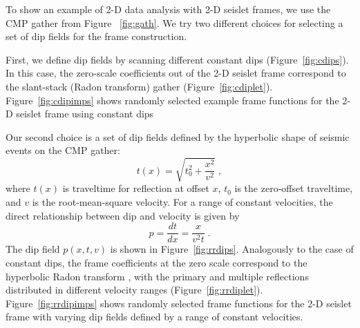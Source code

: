 \begin{comment}
The example is spectral decomposition of a 2-D seismic section,
extracted from the Boonsville 3-D dataset \cite[]{boon} and shown in
Figure~\ref{fig:boon}.  
We use a multi-channel PEF to detect the dominant
frequency components in all traces and then apply 1-D seislet frame
to separate different data components. Two of the components are
displayed in Figures~\ref{fig:boon3,flet3,spec3} and
\ref{fig:boon2,flet2,spec2}.  The first component corresponds to
relatively low frequencies, the second component corresponds to
relatively high frequencies (Figures~\ref{fig:boon3} and
\ref{fig:boon2}). The two components exhibit a high compression ratio
in the transform domain (Figures~\ref{fig:flet3} and \ref{fig:flet2})
and correspond to different parts of the spectrum
(Figures~\ref{fig:spec3} and \ref{fig:spec2}, compare with
Figure~\ref{fig:bspec}). Spectral decomposition
has important applications in seismic interpretation
\cite[]{spectral}.  By increasing the PEF size and, correspondingly,
the number of frame frequencies, one could obtain a more detailed
decomposition of the original data.

\subsection{Hyperbolic radon transform with 2-D seislet frame}
\end{comment}

To show an example of 2-D data analysis with 2-D seislet frames, we
use the CMP gather from Figure ~\ref{fig:gath}.  We try two different
choices for selecting a set of dip fields for the frame construction.

First, we define dip fields by scanning different constant dips
(Figure~\ref{fig:cdips}). In this case, the zero-scale coefficients
out of the 2-D seislet frame correspond to the slant-stack (Radon transform) gather
(Figure~\ref{fig:cdiplet}). Figure~\ref{fig:cdipimps} shows
randomly selected example frame functions for the 2-D seislet frame using constant dips

Our second choice is a set of dip fields defined by the hyperbolic shape
of seismic events on the CMP gather:
\begin{equation}
t(x)=\sqrt{t^2_0+\frac{x^2}{v^2}}\;,
\label{eq:hyper}
\end{equation} 
where $t(x)$ is traveltime for reflection at offset $x$,
$t_0$ is the zero-offset traveltime, and $v$ is the root-mean-square
velocity. For a range of constant velocities, the direct relationship between dip and
velocity is given by 
\begin{equation}
p =\frac{dt}{dx}=\frac{x}{v^2 t}\;.
\label{eq:hyperdip}
\end{equation} 
The dip field $p(x,t,v)$ is shown in
Figure~\ref{fig:rrdips}. Analogously to the case of constant dips, the
frame coefficients at the zero scale correspond to the hyperbolic
Radon transform \cite[]{GEO50-12-27272741}, with the primary and
multiple reflections distributed in different velocity ranges
(Figure~\ref{fig:rrdiplet}).  Figure~\ref{fig:rrdipimps} shows
randomly selected frame functions for the 2-D seislet frame with
varying dip fields defined by a range of constant velocities.

